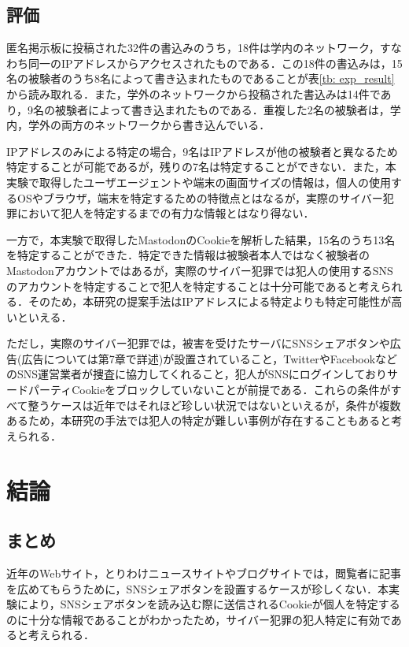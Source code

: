 \documentclass[10pt, a4paper]{jreport}
\begin{document}
\section{評価}
匿名掲示板に投稿された32件の書込みのうち，18件は学内のネットワーク，すなわち同一のIPアドレスからアクセスされたものである．この18件の書込みは，15名の被験者のうち8名によって書き込まれたものであることが表\ref{tb: exp_result}から読み取れる．また，学外のネットワークから投稿された書込みは14件であり，9名の被験者によって書き込まれたものである．重複した2名の被験者は，学内，学外の両方のネットワークから書き込んでいる．

IPアドレスのみによる特定の場合，9名はIPアドレスが他の被験者と異なるため特定することが可能であるが，残りの7名は特定することができない．また，本実験で取得したユーザエージェントや端末の画面サイズの情報は，個人の使用するOSやブラウザ，端末を特定するための特徴点とはなるが，実際のサイバー犯罪において犯人を特定するまでの有力な情報とはなり得ない．

一方で，本実験で取得したMastodonのCookieを解析した結果，15名のうち13名を特定することができた．特定できた情報は被験者本人ではなく被験者のMastodonアカウントではあるが，実際のサイバー犯罪では犯人の使用するSNSのアカウントを特定することで犯人を特定することは十分可能であると考えられる．そのため，本研究の提案手法はIPアドレスによる特定よりも特定可能性が高いといえる．

ただし，実際のサイバー犯罪では，被害を受けたサーバにSNSシェアボタンや広告(広告については第7章で詳述)が設置されていること，TwitterやFacebookなどのSNS運営業者が捜査に協力してくれること，犯人がSNSにログインしておりサードパーティCookieをブロックしていないことが前提である．これらの条件がすべて整うケースは近年ではそれほど珍しい状況ではないといえるが，条件が複数あるため，本研究の手法では犯人の特定が難しい事例が存在することもあると考えられる．


























\chapter{結論}
\section{まとめ}
近年のWebサイト，とりわけニュースサイトやブログサイトでは，閲覧者に記事を広めてもらうために，SNSシェアボタンを設置するケースが珍しくない．本実験により，SNSシェアボタンを読み込む際に送信されるCookieが個人を特定するのに十分な情報であることがわかったため，サイバー犯罪の犯人特定に有効であると考えられる．
\end{document}
